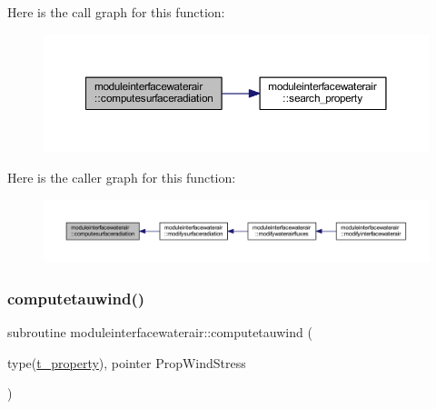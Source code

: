 Here is the call graph for this function\+:\nopagebreak
\begin{figure}[H]
\begin{center}
\leavevmode
\includegraphics[width=350pt]{namespacemoduleinterfacewaterair_ac9ef1ef38af46f9428d5e550057e60b9_cgraph}
\end{center}
\end{figure}
Here is the caller graph for this function\+:\nopagebreak
\begin{figure}[H]
\begin{center}
\leavevmode
\includegraphics[width=350pt]{namespacemoduleinterfacewaterair_ac9ef1ef38af46f9428d5e550057e60b9_icgraph}
\end{center}
\end{figure}
\mbox{\label{namespacemoduleinterfacewaterair_aa8b103904b5c34125450b64aeff53081}} 
\subsubsection{\texorpdfstring{computetauwind()}{computetauwind()}}
{\footnotesize\ttfamily subroutine moduleinterfacewaterair\+::computetauwind (\begin{DoxyParamCaption}\item[{type(\mbox{\hyperlink{structmoduleinterfacewaterair_1_1t__property}{t\+\_\+property}}), pointer}]{Prop\+Wind\+Stress }\end{DoxyParamCaption})\hspace{0.3cm}{\ttfamily [private]}}

